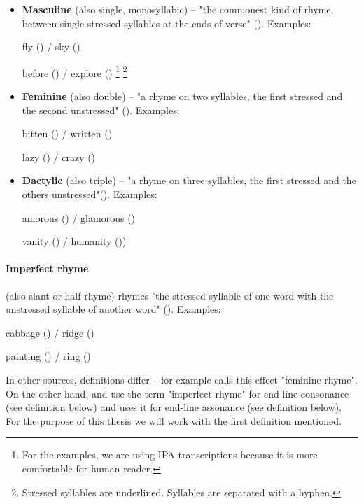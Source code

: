 \begin{itemize}
	\item \textbf{Masculine} (also single, monosyllabic) -- "the commonest kind of rhyme, between single stressed syllables at the ends of verse" (\cite{oxforddict2008literary}). 
	Examples: 
	
	fly () / sky ()

	before () / explore ()
	\footnote{For the examples, we are using IPA transcriptions because it is more comfortable for human reader.}
	\footnote{Stressed syllables are underlined. Syllables are separated with a hyphen.}
	
	\item \textbf{Feminine} (also double) -- "a rhyme on two syllables, the first stressed and the second unstressed" (\cite{oxforddict2008literary}). Examples: 
	
	bitten () / written ()
	
	lazy () / crazy ()
	
	\item \textbf{Dactylic} (also triple) -- "a rhyme on three syllables, the first stressed and the others unstressed"(\cite{oxforddict2008literary}). Examples: 
	
	amorous () / glamorous ()
	
	vanity () / humanity ())
	
\end{itemize}

\paragraph{Imperfect rhyme} (also slant or half rhyme)  rhymes "the stressed syllable of one word with the unstressed syllable of another word" (\cite{bergman2017litcharts}). Examples: 

cabbage () / ridge ()

painting () / ring ()

\noindent In other sources, definitions differ -- for example \cite{literarydevices2020} calls this effect "feminine rhyme".  On the other hand, \cite{oxforddict2008literary} and \cite{britannica} use the term "imperfect rhyme" for end-line consonance (see definition below) and \cite{vanphonological} uses it for end-line assonance (see definition below). For the purpose of this thesis we will work with the first definition mentioned.

